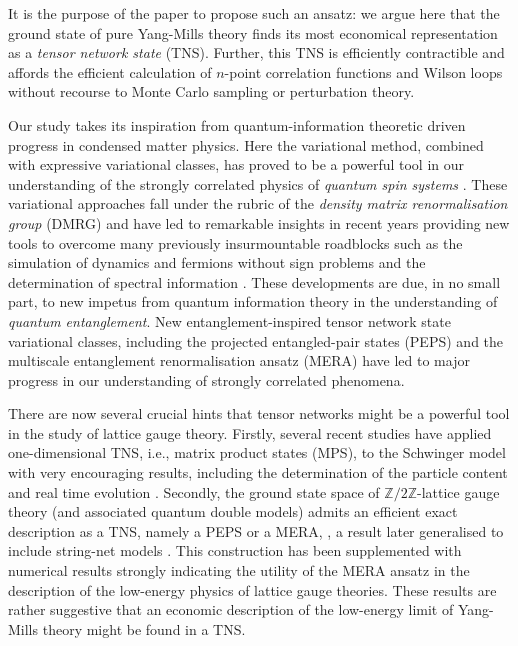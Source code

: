 \documentclass[twocolumn,lengthcheck,superscriptaddress]{revtex4-1}
\theoremstyle{definition}
\theoremstyle{remark}
\begin{document}
It is the purpose of the paper to propose such an ansatz: we argue here that the ground state of pure Yang-Mills theory finds its most economical representation as a \emph{tensor network state} (TNS). Further, this TNS is efficiently contractible and affords the efficient calculation of $n$-point correlation functions and Wilson loops without recourse to Monte Carlo sampling or perturbation theory.

Our study takes its inspiration from quantum-information theoretic driven progress in condensed matter physics. Here the variational method, combined with expressive variational classes, has proved to be a powerful tool in our understanding of the strongly correlated physics of \emph{quantum spin systems} \cite{auerbach:1994a, sachdev:2011a}. These variational approaches fall under the rubric of the \emph{density matrix renormalisation group} (DMRG) \cite{schollwoeck:2005a,schollwock:2011a} and have led to remarkable insights in recent years providing new tools to overcome many previously insurmountable roadblocks such as the simulation of dynamics \cite{vidal:2003a, haegeman:2011b} and fermions \cite{corboz:2009a, corboz:2010a, corboz:2010b, kraus:2010a} without sign problems and the determination of spectral information \cite{haegeman:2012a}. These developments are due, in no small part, to new impetus from quantum information theory in the understanding of \emph{quantum entanglement}. New entanglement-inspired tensor network state variational classes, including the projected entangled-pair states (PEPS) \cite{verstraete:2004a} and the multiscale entanglement renormalisation ansatz (MERA) \cite{vidal:2006a, vidal:2007a} have led to major progress in our understanding of strongly correlated phenomena.

There are now several crucial hints that tensor networks might be a powerful tool in the study of lattice gauge theory. Firstly, several recent studies have applied one-dimensional TNS, i.e., matrix product states (MPS), to the Schwinger model with very encouraging results, including the determination of the particle content and real time evolution \cite{byrnes:2002a,sugihara:2005a,banuls:2013b,banuls:2013a,buyens:2014,buyens:2015dkc,rico:2014,kuhn:2015,buyens_tensor_2015,pichler_real-time_2016,dittrich_decorated_2014,tagliacozzo_tensor_2014,silvi_lattice_2014,dalmonte_lattice_2016}. Secondly, the ground state space of $\mathbb{Z}/2\mathbb{Z}$-lattice gauge theory (and associated quantum double models) admits an efficient exact description as a TNS, namely a PEPS or a MERA, \cite{dennis:2002a, aguado:2008a}, a result later generalised to include string-net models \cite{buerschaper:2009a, koenig:2009a}. This construction has been supplemented with numerical results \cite{tagliacozzo:2011a} strongly indicating the utility of the MERA ansatz in the description of the low-energy physics of lattice gauge theories. These results are rather suggestive that an economic description of the low-energy limit of Yang-Mills theory might be found in a TNS.
\end{document}
